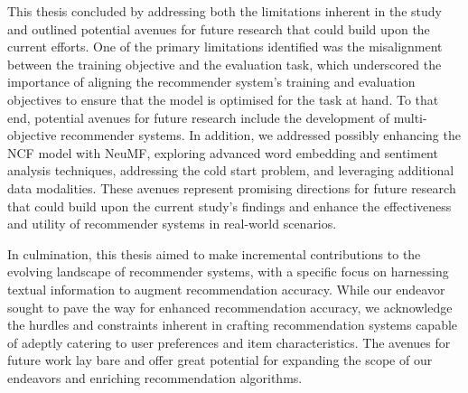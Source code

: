 This thesis concluded by addressing both the limitations inherent in the study and outlined potential avenues for future research that could build upon the current efforts. One of the primary limitations identified was the misalignment between the training objective and the evaluation task, which underscored the importance of aligning the recommender system's training and evaluation objectives to ensure that the model is optimised for the task at hand. To that end, potential avenues for future research include the development of multi-objective recommender systems. In addition, we addressed possibly enhancing the NCF model with NeuMF, exploring advanced word embedding and sentiment analysis techniques, addressing the cold start problem, and leveraging additional data modalities. These avenues represent promising directions for future research that could build upon the current study's findings and enhance the effectiveness and utility of recommender systems in real-world scenarios.

In culmination, this thesis aimed to make incremental contributions to the evolving landscape of recommender systems, with a specific focus on harnessing textual information to augment recommendation accuracy. While our endeavor sought to pave the way for enhanced recommendation accuracy, we acknowledge the hurdles and constraints inherent in crafting recommendation systems capable of adeptly catering to user preferences and item characteristics. The avenues for future work lay bare and offer great potential for expanding the scope of our endeavors and enriching recommendation algorithms.